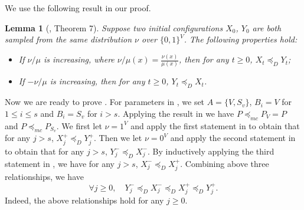 \documentclass[11pt]{amsart}
\newtheorem{lemma}[theorem]{Lemma}
\theoremstyle{definition}
\theoremstyle{remark}
\begin{document}
We use the following result in our proof.
\begin{lemma}[, Theorem 7]\label{lemma:monotone-censoring-to-dominance}
Suppose two initial configurations $X_0$, $Y_0$ are both sampled from the same distribution $\nu$ over $\{0,1\}^V$.
The following properties hold:
\begin{itemize}
    \item If $\nu/\mu$ is increasing, where $\nu/\mu(x) = \frac{\nu(x)}{\mu(x)}$, then for any $t\geq 0$, $X_t\preceq_D Y_t$;
    \item If $-\nu/\mu$ is increasing, then for any $t\geq 0$, $ Y_t\preceq_D X_t$.
\end{itemize}
\end{lemma}


Now we are ready to prove .
For parameters in , we set $A = \{V, S_v\}$, $B_i=V$ for $1\leq i\leq s$ and $B_i=S_v$ for $i>s$.
Applying the result in  we have $P\preceq_{mc} P_{V} = P$ and $P\preceq_{mc} P_{S_v}$.
We first let $\nu=1^V$ and apply the first statement in  to obtain that for any $j>s$, $X_j^+\preceq_D Y_j^+$. 
Then we let $\nu=0^V$ and apply the second statement in  to obtain that for any $j>s$, $Y_j^-\preceq_D X_j^-$.
By inductively applying the third statement in , we have for any $j>s$, $X_j^-\preceq_D X_j^+$. Combining above three relationships, we have
\[\forall j \geq 0, \quad Y_j^-\preceq_D X_j^- \preceq_D X_j^+\preceq_D Y_j^+.\] 
Indeed, the above relationships hold for any $j\geq 0$. %
\end{document}
